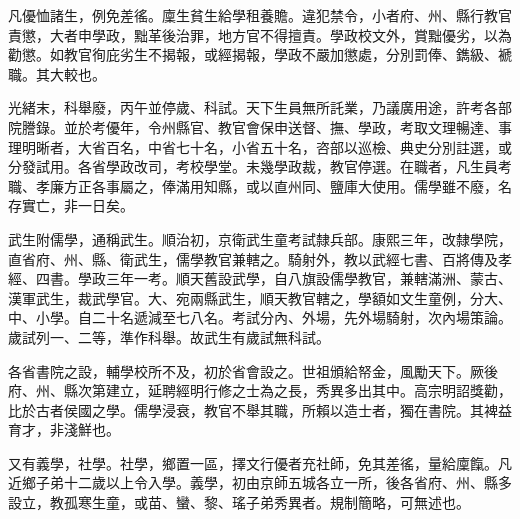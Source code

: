 \begin{pinyinscope}
凡優恤諸生，例免差徭。廩生貧生給學租養贍。違犯禁令，小者府、州、縣行教官責懲，大者申學政，黜革後治罪，地方官不得擅責。學政校文外，賞黜優劣，以為勸懲。如教官徇庇劣生不揭報，或經揭報，學政不嚴加懲處，分別罰俸、鐫級、褫職。其大較也。

光緒末，科舉廢，丙午並停歲、科試。天下生員無所託業，乃議廣用途，許考各部院謄錄。並於考優年，令州縣官、教官會保申送督、撫、學政，考取文理暢達、事理明晰者，大省百名，中省七十名，小省五十名，咨部以巡檢、典史分別註選，或分發試用。各省學政改司，考校學堂。未幾學政裁，教官停選。在職者，凡生員考職、孝廉方正各事屬之，俸滿用知縣，或以直州同、鹽庫大使用。儒學雖不廢，名存實亡，非一日矣。

武生附儒學，通稱武生。順治初，京衛武生童考試隸兵部。康熙三年，改隸學院，直省府、州、縣、衛武生，儒學教官兼轄之。騎射外，教以武經七書、百將傳及孝經、四書。學政三年一考。順天舊設武學，自八旗設儒學教官，兼轄滿洲、蒙古、漢軍武生，裁武學官。大、宛兩縣武生，順天教官轄之，學額如文生童例，分大、中、小學。自二十名遞減至七八名。考試分內、外場，先外場騎射，次內場策論。歲試列一、二等，準作科舉。故武生有歲試無科試。

各省書院之設，輔學校所不及，初於省會設之。世祖頒給帑金，風勵天下。厥後府、州、縣次第建立，延聘經明行修之士為之長，秀異多出其中。高宗明詔獎勸，比於古者侯國之學。儒學浸衰，教官不舉其職，所賴以造士者，獨在書院。其裨益育才，非淺鮮也。

又有義學，社學。社學，鄉置一區，擇文行優者充社師，免其差徭，量給廩餼。凡近鄉子弟十二歲以上令入學。義學，初由京師五城各立一所，後各省府、州、縣多設立，教孤寒生童，或苗、蠻、黎、瑤子弟秀異者。規制簡略，可無述也。


\end{pinyinscope}